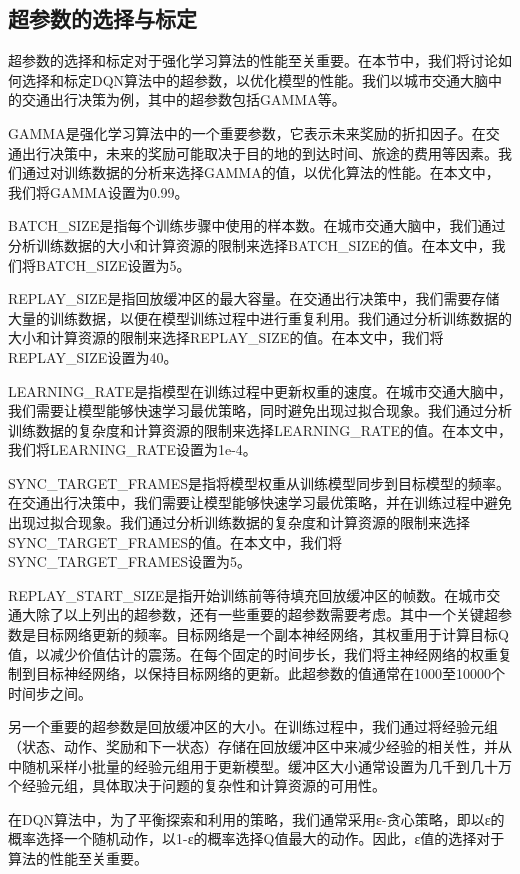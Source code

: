 \subsection{超参数的选择与标定}

超参数的选择和标定对于强化学习算法的性能至关重要。在本节中，我们将讨论如何选择和标定DQN算法中的超参数，以优化模型的性能。我们以城市交通大脑中的交通出行决策为例，其中的超参数包括GAMMA等。

GAMMA是强化学习算法中的一个重要参数，它表示未来奖励的折扣因子。在交通出行决策中，未来的奖励可能取决于目的地的到达时间、旅途的费用等因素。我们通过对训练数据的分析来选择GAMMA的值，以优化算法的性能。在本文中，我们将GAMMA设置为0.99。

BATCH\_SIZE是指每个训练步骤中使用的样本数。在城市交通大脑中，我们通过分析训练数据的大小和计算资源的限制来选择BATCH\_SIZE的值。在本文中，我们将BATCH\_SIZE设置为5。

REPLAY\_SIZE是指回放缓冲区的最大容量。在交通出行决策中，我们需要存储大量的训练数据，以便在模型训练过程中进行重复利用。我们通过分析训练数据的大小和计算资源的限制来选择REPLAY\_SIZE的值。在本文中，我们将REPLAY\_SIZE设置为40。

LEARNING\_RATE是指模型在训练过程中更新权重的速度。在城市交通大脑中，我们需要让模型能够快速学习最优策略，同时避免出现过拟合现象。我们通过分析训练数据的复杂度和计算资源的限制来选择LEARNING\_RATE的值。在本文中，我们将LEARNING\_RATE设置为1e-4。

SYNC\_TARGET\_FRAMES是指将模型权重从训练模型同步到目标模型的频率。在交通出行决策中，我们需要让模型能够快速学习最优策略，并在训练过程中避免出现过拟合现象。我们通过分析训练数据的复杂度和计算资源的限制来选择SYNC\_TARGET\_FRAMES的值。在本文中，我们将SYNC\_TARGET\_FRAMES设置为5。

REPLAY\_START\_SIZE是指开始训练前等待填充回放缓冲区的帧数。在城市交通大除了以上列出的超参数，还有一些重要的超参数需要考虑。其中一个关键超参数是目标网络更新的频率。目标网络是一个副本神经网络，其权重用于计算目标Q值，以减少价值估计的震荡。在每个固定的时间步长，我们将主神经网络的权重复制到目标神经网络，以保持目标网络的更新。此超参数的值通常在1000至10000个时间步之间。

另一个重要的超参数是回放缓冲区的大小。在训练过程中，我们通过将经验元组（状态、动作、奖励和下一状态）存储在回放缓冲区中来减少经验的相关性，并从中随机采样小批量的经验元组用于更新模型。缓冲区大小通常设置为几千到几十万个经验元组，具体取决于问题的复杂性和计算资源的可用性。

在DQN算法中，为了平衡探索和利用的策略，我们通常采用ε-贪心策略，即以ε的概率选择一个随机动作，以1-ε的概率选择Q值最大的动作。因此，ε值的选择对于算法的性能至关重要。

